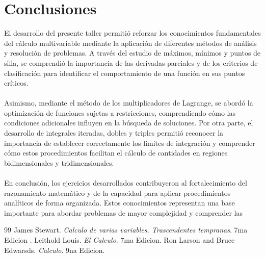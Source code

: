 \documentclass[12pt,a4paper]{report}
\begin{document}
\chapter*{Conclusiones}
El desarrollo del presente taller permitió reforzar los conocimientos fundamentales del cálculo multivariable mediante la aplicación de diferentes métodos de análisis y resolución de problemas. A través del estudio de máximos, mínimos y puntos de silla, se comprendió la importancia de las derivadas parciales y de los criterios de clasificación para identificar el comportamiento de una función en sus puntos críticos.\\
\\
Asimismo, mediante el método de los multiplicadores de Lagrange, se abordó la optimización de funciones sujetas a restricciones, comprendiendo cómo las condiciones adicionales influyen en la búsqueda de soluciones. Por otra parte, el desarrollo de integrales iteradas, dobles y triples permitió reconocer la importancia de establecer correctamente los límites de integración y comprender cómo estos procedimientos facilitan el cálculo de cantidades en regiones bidimensionales y tridimensionales.\\
\\
En conclusión, los ejercicios desarrollados contribuyeron al fortalecimiento del razonamiento matemático y de la capacidad para aplicar procedimientos analíticos de forma organizada. Estos conocimientos representan una base importante para abordar problemas de mayor complejidad y comprender las

\newpage
{}
\begin{thebibliography}{99}
 James Stewart. \textit{Calculo de varias variables. Trascendentes tempranas}. 7ma Edicion .
 Leithold Louis. \textit{El Calculo}. 7ma Edicion.
 Ron Larson and Bruce Edwarsds. \textit{ Calculo}. 9na Edicion.
\end{thebibliography}
\end{document}
